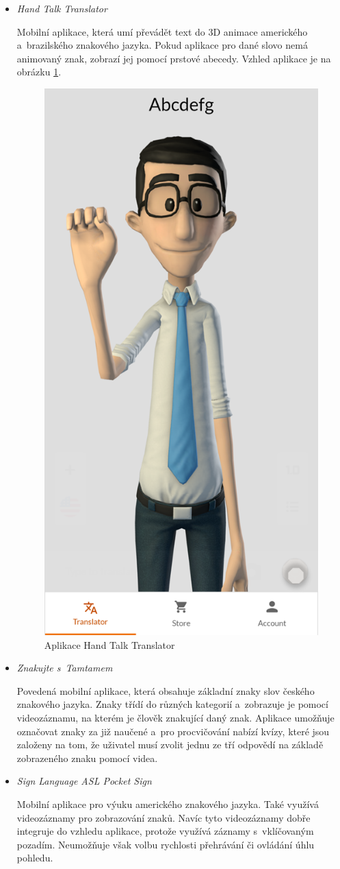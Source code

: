 \documentclass[
  master,
  program=ainfvs,
  biblatex,
  figures=true,
  tables=false,
  sourcecodes=true,
  glossaries,
  index
]{kidiplom}
\begin{document}
        \begin{itemize}
        \item \emph{Hand Talk Translator} \par
                Mobilní aplikace, která umí převádět text do 3D animace amerického a~brazilského znakového jazyka. Pokud aplikace pro dané slovo nemá animovaný znak, zobrazí jej pomocí prstové abecedy. Vzhled aplikace je na obrázku \ref{hand-talk-translator}. \cite{handtalk}
    
                \begin{figure}[htbp]
                    \centering
                    \includegraphics[width=0.25\columnwidth]{graphics/hand-talk-translator.png}
                    \caption{Aplikace Hand Talk Translator}
                    \label{hand-talk-translator}
                \end{figure}
                
            \item \emph{Znakujte s~Tamtamem} \par
                Povedená mobilní aplikace, která obsahuje základní znaky slov českého znakového jazyka. Znaky třídí do různých kategorií a~zobrazuje je pomocí videozáznamu, na kterém je člověk znakující daný znak. Aplikace umožňuje označovat znaky za již naučené a~pro procvičování nabízí kvízy, které jsou založeny na tom, že uživatel musí zvolit jednu ze tří odpovědí na základě zobrazeného znaku pomocí videa. \cite{tamtam}                

            \item \emph{Sign Language ASL Pocket Sign} \par
                Mobilní aplikace pro výuku amerického znakového jazyka. Také využívá videozáznamy pro zobrazování znaků. Navíc tyto videozáznamy dobře integruje do vzhledu aplikace, protože využívá záznamy s~vklíčovaným pozadím. Neumožňuje však volbu rychlosti přehrávání či ovládání úhlu pohledu. \cite{pocket-sign}
             

\end{itemize}
\end{document}

